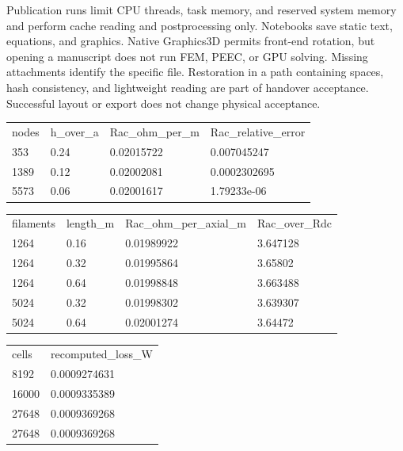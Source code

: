 \documentclass[11pt]{article}
\begin{document}
Publication runs limit CPU threads, task memory, and reserved system memory and perform cache reading and postprocessing only. Notebooks save static text, equations, and graphics. Native Graphics3D permits front-end rotation, but opening a manuscript does not run FEM, PEEC, or GPU solving. Missing attachments identify the specific file. Restoration in a path containing spaces, hash consistency, and lightweight reading are part of handover acceptance. Successful layout or export does not change physical acceptance.


\begin{table}[!htbp]
\par
\begingroup\footnotesize\begin{tabular}{p{40.45mm}|p{40.45mm}|p{40.45mm}|p{40.45mm}}
\toprule
nodes & h\_\allowbreak over\_\allowbreak a & Rac\_\allowbreak ohm\_\allowbreak per\_\allowbreak m & Rac\_\allowbreak relative\_\allowbreak error\\
353 & 0.24 & 0.02015722 & 0.007045247\\
1389 & 0.12 & 0.02002081 & 0.0002302695\\
5573 & 0.06 & 0.02001617 & 1.79233e-06\\
\bottomrule\end{tabular}\endgroup
\end{table}
\begin{table}[!htbp]
\par
\begingroup\footnotesize\begin{tabular}{p{40.45mm}|p{40.45mm}|p{40.45mm}|p{40.45mm}}
\toprule
filaments & length\_\allowbreak m & Rac\_\allowbreak ohm\_\allowbreak per\_\allowbreak axial\_\allowbreak m & Rac\_\allowbreak over\_\allowbreak Rdc\\
1264 & 0.16 & 0.01989922 & 3.647128\\
1264 & 0.32 & 0.01995864 & 3.65802\\
1264 & 0.64 & 0.01998848 & 3.663488\\
5024 & 0.32 & 0.01998302 & 3.639307\\
5024 & 0.64 & 0.02001274 & 3.64472\\
\bottomrule\end{tabular}\endgroup
\end{table}
\begin{table}[!htbp]
\par
\begingroup\footnotesize\begin{tabular}{p{84.9mm}|p{84.9mm}}
\toprule
cells & recomputed\_\allowbreak loss\_\allowbreak W\\
8192 & 0.0009274631\\
16000 & 0.0009335389\\
27648 & 0.0009369268\\
27648 & 0.0009369268\\
\bottomrule\end{tabular}\endgroup
\end{table}
\end{document}
